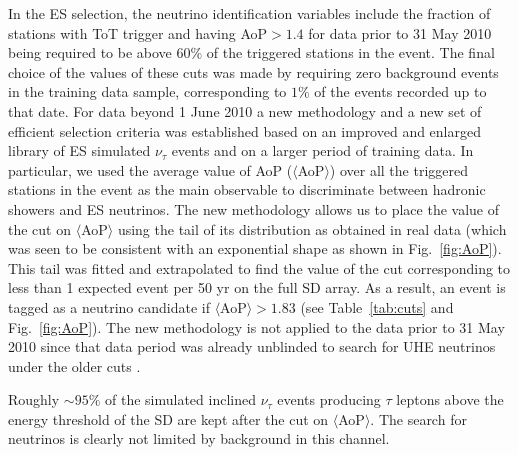 \documentclass[reprint,showpacs,showkeys,amsmath,amssymb,aps,nofootinbib]{revtex4-1}
\begin{document}
In the ES selection, the neutrino identification variables include the fraction 
of stations with ToT trigger and having AoP$>1.4$ for data prior to 31 May 2010 \cite{ES} 
being required to be above $60\%$ of the triggered stations in the event.
The final choice of the values of these cuts was 
made by requiring zero background events in the training data sample,
corresponding to $1\%$ of the events recorded up to that date.
For data beyond 1 June 2010 a new methodology and 
a new set of efficient selection criteria was established
based on an improved and enlarged library of ES 
simulated $\nu_\tau$ events 
and on a larger period of training data. 
In particular, we used the average value of AoP ($\langle$AoP$\rangle$) 
over all the triggered stations in the event as the main observable to 
discriminate between hadronic showers and ES neutrinos. 
The new methodology allows us to place the 
value of the cut on $\langle$AoP$\rangle$ 
using the tail of its distribution 
as obtained in real data
(which was seen to be consistent with an exponential shape as shown in Fig.~\ref{fig:AoP}). 
This tail was fitted and extrapolated to find the value of the cut corresponding 
to less than 1 expected event per 50 yr on the full SD array. 
As a result, an event is tagged as a neutrino candidate if $\langle$AoP$\rangle> 1.83$
(see Table~\ref{tab:cuts} and Fig.~\ref{fig:AoP}). 
The new methodology is not applied to the data prior to 31 May 2010
since that data period was already unblinded to search for UHE neutrinos 
under the older cuts \cite{ES}. 

Roughly $\sim 95\%$ of the simulated 
inclined $\nu_\tau$ events producing $\tau$ leptons above the energy threshold of the SD 
are kept after the cut on $\langle$AoP$\rangle$. The search for neutrinos is clearly not 
limited by background in this channel.  
\end{document}
